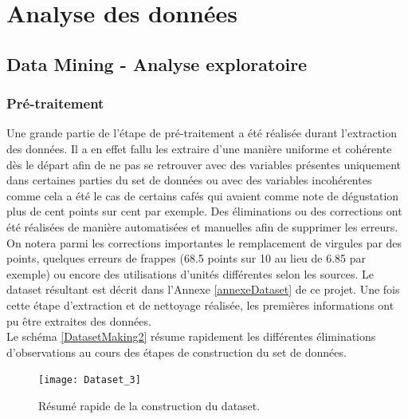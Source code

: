 
\chapter{Analyse des données}
\minitoc

\newpage
\section{Data Mining - Analyse exploratoire}
\subsection{Pré-traitement}



Une grande partie de l'étape de pré-traitement a été réalisée durant l'extraction des données. Il a en effet fallu les extraire d'une manière uniforme et cohérente dès le départ afin de ne pas se retrouver avec des variables présentes uniquement dans certaines parties du set de données ou avec des variables incohérentes comme cela a été le cas de certains cafés qui avaient comme note de dégustation plus de cent points sur cent par exemple. Des éliminations ou des corrections ont été réalisées de manière automatisées et manuelles afin de supprimer les erreurs. On notera parmi les corrections importantes le remplacement de virgules par des points, quelques erreurs de frappes (68.5 points sur 10 au lieu de 6.85 par exemple) ou encore des utilisations d'unités différentes selon les sources. Le dataset résultant est décrit dans l'Annexe \ref{annexeDataset} de ce projet. Une fois cette étape d'extraction et de nettoyage réalisée, les premières informations ont pu être extraites des données.\\


\noindent Le schéma \ref{DatasetMaking2} résume rapidement les différentes éliminations d'observations au cours des étapes de construction du set de données. 

\begin{figure}[H]
	\centering
	\texttt{[image: Dataset\_3]}
	\caption{\label{DatasetMaking1} Résumé rapide de la construction du dataset.}
\end{figure}


